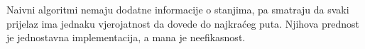 Naivni algoritmi  nemaju dodatne informacije o stanjima, pa smatraju da svaki prijelaz ima jednaku vjerojatnost da dovede do najkraćeg puta. 
Njihova prednost je jednostavna implementacija, a mana je neefikasnost. 
